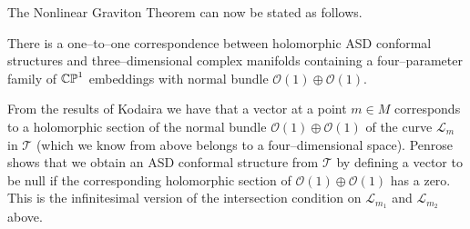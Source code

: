 


The Nonlinear Graviton Theorem can now be stated as follows.
\begin{theo}
There is a one--to--one correspondence between holomorphic ASD conformal structures and three--dimensional complex manifolds containing a four--parameter family of $\mathbb{CP}^1$ embeddings with normal bundle $\mathcal{O}(1)\oplus\mathcal{O}(1)$.
\end{theo}
\noindent
From the results of Kodaira \cite{Kodaira} we have that a vector at a point $m\in M$ corresponds to a holomorphic section of the normal bundle $\mathcal{O}(1)\oplus\mathcal{O}(1)$ of the curve $\mathscr{L}_m$ in $\mathscr{T}$ (which we know from above belongs to a four--dimensional space). Penrose shows that we obtain an ASD conformal structure from $\mathscr{T}$ by defining a vector to be null if the corresponding holomorphic section of $\mathcal{O}(1)\oplus\mathcal{O}(1)$ has a zero. This is the infinitesimal version of the intersection condition on $\mathscr{L}_{m_1}$ and $\mathscr{L}_{m_2}$ above. %



